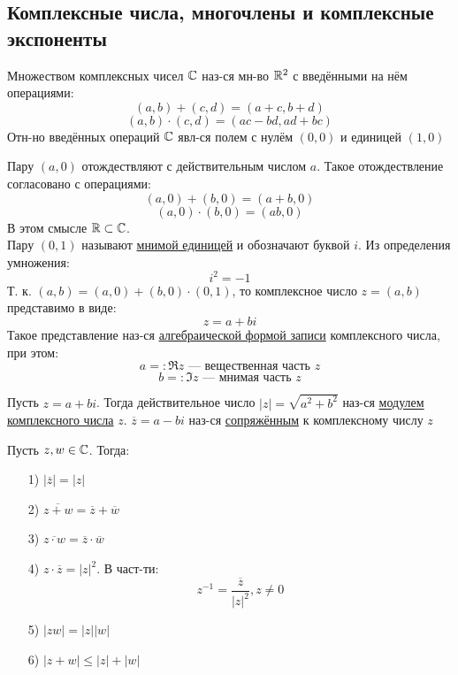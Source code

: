 \subsection{Комплексные числа, многочлены и комплексные экспоненты}
\begin{definition}
Множеством комплексных чисел $\mathbb{C}$ наз-ся мн-во $\mathbb{R}^{2}$ с введёнными на нём операциями:
\[
  (a, b) + (c, d) = (a + c, b + d)
\]
\[
  (a, b) \cdot (c, d) = (ac - bd, ad + bc)
\]
  Отн-но введённых операций $\mathbb{C}$ явл-ся полем с нулём $(0, 0)$ и единицей $(1, 0)$
\end{definition}
\begin{note}
Пару $(a, 0)$ отождествляют с действительным числом $a$. Такое отождествление согласовано с операциями:
\[
  (a, 0) + (b, 0) = (a + b, 0)
\]
\[
  (a, 0) \cdot (b, 0) = (ab, 0)
\]
В этом смысле $\mathbb{R} \subset \mathbb{C}$. \\
Пару $(0, 1)$ называют \underline{мнимой единицей} и обозначают буквой $i$. Из определения умножения:
\[
  i^{2} = -1
\]
Т. к. $(a, b) = (a, 0) + (b, 0) \cdot (0, 1)$, то комплексное число $z = (a, b)$ представимо в виде:
\[
z = a + bi
\]
Такое представление наз-ся \underline{алгебраической формой записи} комплексного числа, при этом:
\[
a =: \Re z \text{ --- вещественная часть $z$}
\]
\[
b =: \Im z \text{ --- мнимая часть $z$}
\]
\end{note}
\begin{definition}
Пусть $z = a + bi$. Тогда действительное число $\left|z\right| = \sqrt{a^{2} + b^{2}}$ наз-ся \underline{модулем комплексного числа} $z$. 
$\overline{z} = a - bi$ наз-ся \underline{сопряжённым} к комплексному числу $z$
\end{definition}
\begin{lemma}
Пусть $z, w \in \mathbb{C}$. Тогда:
\begin{itemize}
  \item [1) ] $\left|\overline{z}\right| = \left|z\right|$
  \item [2) ] $\overline{z + w} = \overline{z} + \overline{w}$
  \item [3) ] $\overline{z \cdot w} = \overline{z} \cdot \overline{w}$
  \item [4) ] $z \cdot \overline{z} = \left|z\right|^{2}$. В част-ти:
    \[
    z^{-1} = \frac{\overline{z}}{\left|z\right|^{2}}, z \neq 0
    \]
  \item [5) ] $\left|zw\right| = \left|z\right|\left|w\right|$
  \item [6) ] $\left|z + w\right| \leq \left|z\right| + \left|w\right|$
\end{itemize}
\end{lemma}
